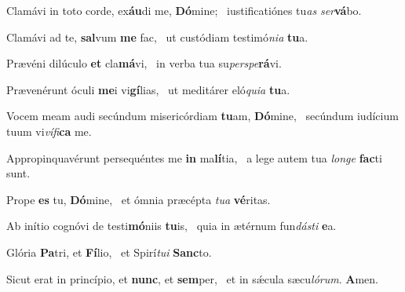 \item Clamávi in toto corde, ex\textbf{áu}di me, \textbf{Dó}mine;~\psstar{} iustificatiónes tu\textit{as} \textit{ser}\textbf{vá}bo.

\item Clamávi ad te, \textbf{sal}vum \textbf{me} fac,~\psstar{} ut custódiam testimó\textit{nia} \textbf{tu}a.

\item Prævéni dilúculo \textbf{et} cla\textbf{má}vi,~\psstar{} in verba tua su\textit{perspe}\textbf{rá}vi.

\item Prævenérunt óculi \textbf{me}i vi\textbf{gí}lias,~\psstar{} ut meditárer eló\textit{quia} \textbf{tu}a.

\item Vocem meam audi secúndum misericórdiam \textbf{tu}am, \textbf{Dó}mine,~\psstar{} secúndum iudícium tuum vi\textit{vífi}\textbf{ca} me.

\item Appropinquavérunt persequéntes me \textbf{in} ma\textbf{lí}tia,~\psstar{} a lege autem tua \textit{longe} \textbf{fac}ti sunt.

\item Prope \textbf{es} tu, \textbf{Dó}mine,~\psstar{} et ómnia præcépta \textit{tua} \textbf{vé}ritas.

\item Ab inítio cognóvi de testi\textbf{mó}niis \textbf{tu}is,~\psstar{} quia in ætérnum fun\textit{dásti} \textbf{e}a.

\item Glória \textbf{Pa}tri, et \textbf{Fí}lio,~\psstar{} et Spirí\textit{tui} \textbf{Sanc}to.

\item Sicut erat in princípio, et \textbf{nunc}, et \textbf{sem}per,~\psstar{} et in sǽcula sæcu\textit{lórum}. \textbf{A}men.